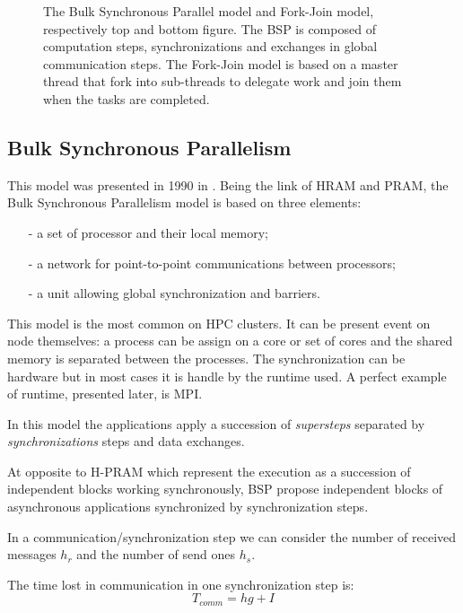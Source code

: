 \begin{figure}
\begin{center}

\end{center}
\caption[BSP and Fork-Join model]{The Bulk Synchronous Parallel model and Fork-Join model, respectively top and bottom figure. The BSP is composed of computation steps, synchronizations and  exchanges in global communication steps. The Fork-Join model is based on a master thread that fork into sub-threads to delegate work and join them when the tasks are completed.} 
\label{fig:3_SOFT:bsp_fj}
\end{figure}

\subsection{Bulk Synchronous Parallelism }
This model was presented in 1990 in \cite{valiant1990bridging}.
Being the link of HRAM and PRAM, the Bulk Synchronous Parallelism model is based on three elements:
\begin{itemize}[noitemsep,nolistsep]
  \item[-] a set of processor and their local memory;
  \item[-] a network for point-to-point communications between processors;
  \item[-] a unit allowing global synchronization and barriers.
\end{itemize}
This model is the most common on HPC clusters. 
It can be present event on node themselves: a process can be assign on a core or set of cores and the shared memory is separated between the processes. 
The synchronization can be hardware but in most cases it is handle by the runtime used.
A perfect example of runtime, presented later, is MPI. 

In this model the applications apply a succession of \textit{supersteps} separated by \textit{synchronizations} steps and data exchanges.

At opposite to H-PRAM which represent the execution as a succession of independent blocks working synchronously, BSP propose independent blocks of asynchronous applications synchronized by synchronization steps. 

In a communication/synchronization step we can consider the number of received messages $h_r$ and the number of send ones $h_s$.

The time lost in communication in one synchronization step is:
\begin{equation}
  T_{comm} = hg + I
\end{equation}

